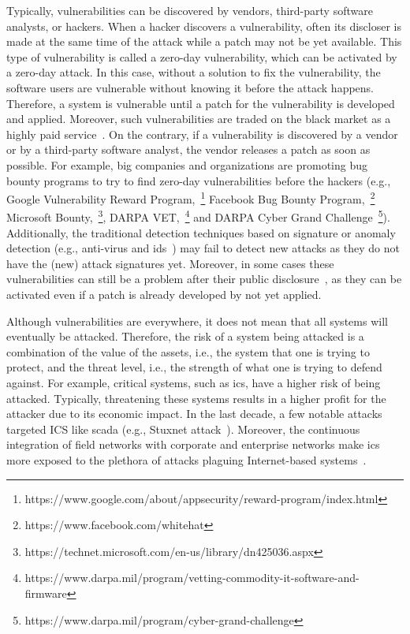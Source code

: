 Typically, vulnerabilities can be discovered by vendors, third-party software analysts, or hackers. 
When a hacker discovers a vulnerability, often its discloser is made at the same time of the attack while a patch may not be yet available. 
This type of vulnerability is called a zero-day vulnerability, which can be activated by a zero-day attack. 
In this case, without a solution to fix the vulnerability, the software users are vulnerable without knowing it before the attack happens.
Therefore, a system is vulnerable until a patch for the vulnerability is developed and applied.
Moreover, such vulnerabilities are traded on the black market as a highly paid service~\cite{Symantec:2017}.
On the contrary, if a vulnerability is discovered by a vendor or by a third-party software analyst, the vendor releases a patch as soon as possible. 
For example, big companies and organizations are promoting bug bounty programs to try to find zero-day vulnerabilities before the hackers (e.g., Google Vulnerability Reward Program,~\footnote{https://www.google.com/about/appsecurity/reward-program/index.html} Facebook Bug Bounty Program,~\footnote{https://www.facebook.com/whitehat} Microsoft Bounty,~\footnote{https://technet.microsoft.com/en-us/library/dn425036.aspx}, DARPA VET,~\footnote{https://www.darpa.mil/program/vetting-commodity-it-software-and-firmware} and DARPA Cyber Grand Challenge~\footnote{https://www.darpa.mil/program/cyber-grand-challenge}).
Additionally, the traditional detection techniques based on signature or anomaly detection (e.g., anti-virus and \gls{ids}~\cite{Sommer:2010}) may fail to detect new attacks as they do not have the (new) attack signatures yet.
Moreover, in some cases these vulnerabilities can still be a problem after their public disclosure~\cite{Bilge:2012}, as they can be activated even if a patch is already developed by not yet applied.



Although vulnerabilities are everywhere, it does not mean that all systems will eventually be attacked. 
Therefore, the risk of a system being attacked is a combination of the value of the assets, i.e., the system that one is trying to protect, and the threat level, i.e., the strength of what one is trying to defend against.
For example, critical systems, such as \gls{ics}, have a higher risk of being attacked.
Typically, threatening these systems results in a higher profit for the attacker due to its economic impact.
In the last decade, a few notable attacks targeted ICS like \gls{scada} (e.g., Stuxnet attack~\cite{stuxnet:2010}).
Moreover, the continuous integration of field networks with corporate and enterprise networks make \gls{ics} more exposed to the plethora of attacks plaguing Internet-based systems~\cite{Kaspersky:2017}.


